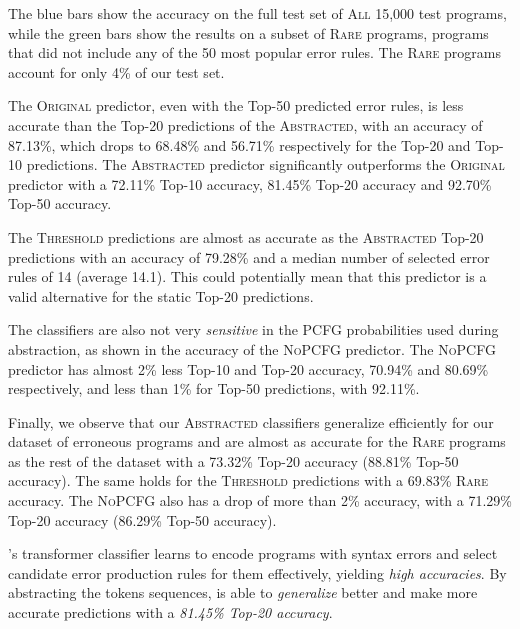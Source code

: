 The blue bars show the accuracy on the full test set of \textsc{All} 15,000 test
programs, while the green bars show the results on a subset of \textsc{Rare}
programs, \ie programs that did not include any of the 50 most popular error
rules. The \textsc{Rare} programs account for only 4\% of our test set.

The \textsc{Original} predictor, even with the Top-50 predicted error rules, is
less accurate than the Top-20 predictions of the \textsc{Abstracted}, with an
accuracy of 87.13\%, which drops to 68.48\% and 56.71\% respectively for the
Top-20 and Top-10 predictions. The \textsc{Abstracted} predictor significantly
outperforms the \textsc{Original} predictor with a 72.11\% Top-10 accuracy,
81.45\% Top-20 accuracy and 92.70\% Top-50 accuracy.

The \textsc{Threshold} predictions are almost as accurate as the
\textsc{Abstracted} Top-20 predictions with an accuracy of 79.28\% and a median
number of selected error rules of 14 (average 14.1). This could potentially mean
that this predictor is a valid alternative for the static Top-20 predictions.

 The classifiers
are also not very \emph{sensitive} in the PCFG probabilities used during
abstraction, as shown in the accuracy of the \textsc{NoPCFG} predictor. The
\textsc{NoPCFG} predictor has almost 2\% less Top-10 and Top-20 accuracy,
70.94\% and 80.69\% respectively, and less than 1\% for Top-50 predictions, with
92.11\%.

Finally, we observe that our \textsc{Abstracted} classifiers generalize
efficiently for our dataset of erroneous \python programs and are almost as
accurate for the \textsc{Rare} programs as the rest of the dataset with a
73.32\% Top-20 accuracy (88.81\% Top-50 accuracy). The same holds for the
\textsc{Threshold} predictions with a 69.83\% \textsc{Rare} accuracy. The
\textsc{NoPCFG} also has a drop of more than 2\% accuracy, with a 71.29\% Top-20
accuracy (86.29\% Top-50 accuracy).

\begin{framed}
  \noindent \toolname's transformer classifier learns to encode programs with
  syntax errors and select candidate error production rules for them
  effectively, yielding \emph{high accuracies}. By abstracting the tokens
  sequences, \toolname is able to \emph{generalize} better and make more
  accurate predictions with a \emph{81.45\% Top-20 accuracy}.
\end{framed}


